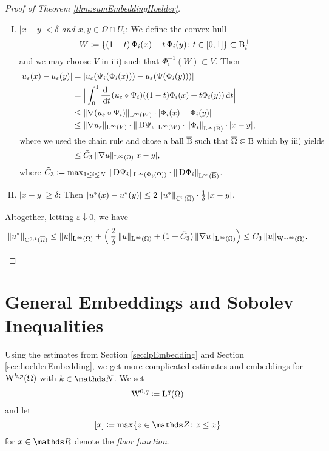 \begin{proof}[Proof of Theorem \ref{thm:sumEmbeddingHoelder}]
\begin{enumerate}[i)]
\begin{enumerate}[I)]
        \item \emph{$|x - y| < \delta$ and $x,y \in \Omega \cap U_i$}:
          We define the convex hull $$W \coloneqq \{ (1 - t)\, \Phi_i(x) + t \,\Phi_i(y) \colon t \in [0,1]\} \subset \mathrm{B}_i^+$$ and we may choose $V$ in iii) such that $\Phi_i^{-1}(W) \subset V$.
          Then
          \begin{align*}
            |u_\varepsilon(x) - u_\varepsilon(y)|
            &= |u_\varepsilon(\Psi_i(\Phi_i(x))) - u_\varepsilon(\Psi(\Phi_i(y)))| \\
            &= \Big| \int_0^1 \frac{\, {\operatorname{d}\!{\ }}}{\, {\operatorname{d}\!{t}}} (u_\varepsilon \circ \Psi_i)((1 - t)\Phi_i(x) + t\Phi_i(y)) \, {\operatorname{d}\!{t}} \Big| \\
            &\leq \| \nabla(u_\varepsilon \circ \Psi_i)\|_{\mathrm{L}^\infty(W)} \cdot |\Phi_i(x) - \Phi_i(y)| \\
            &\leq \| \nabla u_\varepsilon \|_{\mathrm{L}^\infty(V)} \cdot \|\,{\operatorname{D}} \Psi_i\|_{\mathrm{L}^\infty(W)} \cdot \|\Phi_i\|_{\mathrm{L}^\infty(\overline {\mathrm{B}})} \cdot |x - y|, \\
            \intertext{where we used the chain rule and chose a ball $\overline{\mathrm{B}}$ such that $\overline \Omega \Subset \mathrm{B}$ which by iii) yields}
            &\leq \tilde C_3 \, \|\nabla u\|_{\mathrm{L}^\infty(\Omega)} | x - y |,
          \end{align*}
          where $\tilde C_3 \coloneqq \max_{1\leq i \lneq N} \|\,{\operatorname{D}} \Psi_i \|_{\mathrm{L}^\infty(\Phi_i(\Omega))} \cdot \| \,{\operatorname{D}} \Phi_i \|_{\mathrm{L}^\infty(\overline {\mathrm{B}})}$.

        \item $|x - y| \geq \delta$:
          Then 
          $|u^*(x) - u^*(y)| \leq 2 \, \|u^*\|_{\mathrm{C}^0(\overline\Omega)} \cdot \frac{1}{\delta}\, |x - y|$.
      \end{enumerate}
      Altogether, letting $\varepsilon \downarrow 0$, we have 
      $$
      \|u^*\|_{\mathrm{C}^{0,1}(\overline\Omega)} 
      \leq \|u\|_{\mathrm{L}^\infty(\Omega)} + \Big( \, \frac{2}{\delta}\, \|u\|_{\mathrm{L}^\infty(\Omega)} + (1 + \tilde C_3 )\, \|\nabla u\|_{\mathrm{L}^\infty(\Omega)} \Big) 
      \leq C_3 \, \|u\|_{\mathrm{W}^{1,\infty}(\Omega)}.\qedhere$$ 
  \end{enumerate}
\end{proof}

\section{General Embeddings and Sobolev Inequalities}

Using the estimates from Section \ref{sec:lpEmbedding} and Section \ref{sec:hoelderEmbedding}, we get more complicated estimates and embeddings for $\mathrm{W}^{k,p}(\Omega)$ with $k \in \N$.
We set
$$
\mathrm{W}^{0,q} \coloneqq \mathrm{L}^q(\Omega)
$$
and let
$$
[x] \coloneqq \max \{ z \in \Z \colon z \leq x\}
$$
for $x \in \R$ denote the \emph{floor function}.

